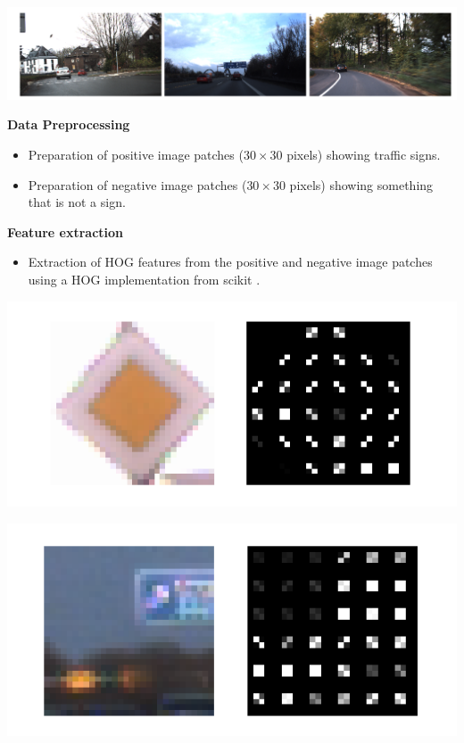 \documentclass[a0paper,portrait]{baposter}
\begin{document}
\begin{poster}
{\begin{center}
\includegraphics[width=1.\textwidth]{ex_imgs_small.png}
\end{center}

}
 



{
\textbf{Data Preprocessing}
\begin{itemize}
	\item Preparation of positive image patches ($30 \times 30$ pixels) showing traffic signs.
	\item Preparation of negative image patches ($30 \times 30$ pixels) showing something that is not a sign. 
\end{itemize}

\textbf{Feature extraction}
\begin{itemize}
	\item Extraction of HOG features from the positive and negative image patches using a HOG implementation from scikit \cite{scikithog}.
\end{itemize}


\begin{minipage}{0.48\textwidth}
\centering
\includegraphics[width=0.7\linewidth]{hog_pos2_small.png}
\end{minipage}
\hfill
\begin{minipage}{0.48\textwidth}
\centering
\includegraphics[width=0.7\linewidth]{hog_neg_small.png}
\end{minipage}


}
\end{poster}
\end{document}
